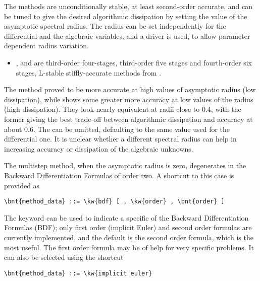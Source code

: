 The methods are unconditionally stable, at least second-order accurate, and can be tuned to give 
the desired algorithmic dissipation
by setting the value of the asymptotic spectral radius.
The radius can be set independently for the differential
and the algebraic variables, and a driver is used, to allow parameter 
dependent radius variation.
\begin{itemize}
\item {},  and  are third-order  four-stages, third-order 
five stages and fourth-order six stages, L-stable stiffly-accurate methods from 
\cite{kennedy_diagonally_2019}.
\end{itemize}

The  method proved to be more accurate at high values of asymptotic
radius (low dissipation), while  shows some greater more accuracy
at low values of the radius (high dissipation).
They look nearly equivalent at radii close to 0.4, with the former
giving the best trade-off between algorithmic dissipation and accuracy 
at about 0.6.
The  can be omitted, defaulting to the same value used for 
the differential one.
It is unclear whether a different spectral radius can help in increasing
accuracy or dissipation of the algebraic unknowns.

\noindent
The multistep method, when the asymptotic radius is zero, degenerates
in the Backward Differentiation Formulas of order two.
A shortcut to this case is provided as
\begin{Verbatim}[commandchars=\\\{\}]
    \bnt{method_data} ::= \kw{bdf} [ , \kw{order} , \bnt{order} ]
\end{Verbatim}
The keyword  can be used to indicate a specific 
of the Backward Differentiation Formulas (BDF); only first order (implicit Euler) and 
second order formulas are currently implemented, and the default
is the second order formula, which is the most useful.
The first order formula may be of help for very specific problems.
It can also be selected using the shortcut
\begin{Verbatim}[commandchars=\\\{\}]
    \bnt{method_data} ::= \kw{implicit euler}
\end{Verbatim}

